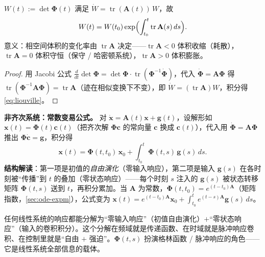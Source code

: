 \begin{proposition}\label{prop:liouville}
$W(t):=\det\boldsymbol{\Phi}(t)$ 满足 $\dot W=\operatorname{tr}(\mathbf{A}(t))\,W$，故
\begin{equation}
  W(t)=W(t_0)\exp\Bigl(\int_{t_0}^t\operatorname{tr}\mathbf{A}(s)\,ds\Bigr).
  \label{eq:liouville}
\end{equation}
意义：相空间体积的变化率由 $\operatorname{tr}\mathbf{A}$ 决定——$\operatorname{tr}\mathbf{A}<0$ 体积收缩（耗散），$\operatorname{tr}\mathbf{A}=0$ 体积守恒（保守 / 哈密顿系统），$\operatorname{tr}\mathbf{A}>0$ 体积膨胀。
\end{proposition}
\begin{proof}
用 Jacobi 公式 $\frac{d}{dt}\det\boldsymbol{\Phi}=\det\boldsymbol{\Phi}\cdot\operatorname{tr}(\boldsymbol{\Phi}^{-1}\dot{\boldsymbol{\Phi}})$，代入 $\dot{\boldsymbol{\Phi}}=\mathbf{A}\boldsymbol{\Phi}$ 得 $\operatorname{tr}(\boldsymbol{\Phi}^{-1}\mathbf{A}\boldsymbol{\Phi})=\operatorname{tr}\mathbf{A}$（迹在相似变换下不变），即 $\dot W=(\operatorname{tr}\mathbf{A})W$，积分得 \cref{eq:liouville}。
\end{proof}

\textbf{非齐次系统：常数变易公式。} 对 $\dot{\mathbf{x}}=\mathbf{A}(t)\mathbf{x}+\mathbf{g}(t)$，设解形如 $\mathbf{x}(t)=\boldsymbol{\Phi}(t)\mathbf{c}(t)$（把齐次解 $\boldsymbol{\Phi}\mathbf{c}$ 的常向量 $\mathbf{c}$ 换成 $\mathbf{c}(t)$），代入用 $\dot{\boldsymbol{\Phi}}=\mathbf{A}\boldsymbol{\Phi}$ 推出 $\boldsymbol{\Phi}\dot{\mathbf{c}}=\mathbf{g}$，积分得
\begin{equation}
  \boxed{\,\mathbf{x}(t)=\boldsymbol{\Phi}(t,t_0)\,\mathbf{x}_0+\int_{t_0}^t\boldsymbol{\Phi}(t,s)\,\mathbf{g}(s)\,ds.\,}
  \label{eq:variation-constants}
\end{equation}
\textbf{结构解读}：第一项是初值的\emph{自由演化}（零输入响应），第二项是输入 $\mathbf{g}(s)$ 在各时刻被“传播”到 $t$ 的叠加（零状态响应）——每个时刻 $s$ 注入的 $\mathbf{g}(s)$ 被状态转移矩阵 $\boldsymbol{\Phi}(t,s)$ 送到 $t$，再积分累加。当 $\mathbf{A}$ 为常数，$\boldsymbol{\Phi}(t,t_0)=e^{(t-t_0)\mathbf{A}}$（矩阵指数，\cref{sec:ode-expm}），公式变为 $\mathbf{x}(t)=e^{(t-t_0)\mathbf{A}}\mathbf{x}_0+\int_{t_0}^t e^{(t-s)\mathbf{A}}\mathbf{g}(s)\,ds$。

\begin{insight}[常数变易公式是“线性 $=$ 叠加”的终极表达]
任何线性系统的响应都能分解为“零输入响应”（初值自由演化）$+$“零状态响应”（输入的卷积积分）。这个分解在频域就是传递函数、在时域就是脉冲响应卷积、在控制里就是“自由 $+$ 强迫”。$\boldsymbol{\Phi}(t,s)$ 扮演格林函数 / 脉冲响应的角色——它是线性系统全部信息的载体。
\end{insight}

